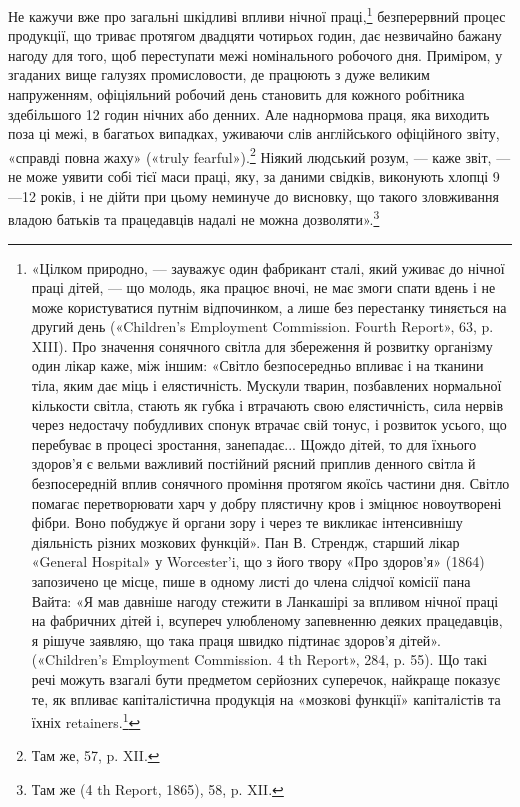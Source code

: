 Не кажучи вже про загальні шкідливі впливи нічної праці,\footnote{
«Цілком природно, — зауважує один фабрикант сталі, який
уживає до нічної праці дітей, — що молодь, яка працює вночі, не має
змоги спати вдень і не може користуватися путнім відпочинком, а лише
без перестанку тиняється на другий день («Children’s Employment Commission.
Fourth Report», 63, p. XIII). Про значення сонячного світла для
збереження й розвитку організму один лікар каже, між іншим: «Світло
безпосередньо впливає і на тканини тіла, яким дає міць і елястичність.
Мускули тварин, позбавлених нормальної кількости світла, стають як губка
і втрачають свою елястичність, сила нервів через недостачу побудливих
спонук втрачає свій тонус, і розвиток усього, що перебуває в процесі
зростання, занепадає... Щождо дітей, то для їхнього здоров’я є вельми
важливий постійний рясний приплив денного світла й безпосередній вплив
сонячного проміння протягом якоїсь частини дня. Світло помагає перетворювати
харч у добру плястичну кров і зміцнює новоутворені фібри. Воно
побуджує й органи зору і через те викликає інтенсивнішу діяльність різних
мозкових функцій». Пан В. Стрендж, старший лікар «General Hospital»
у Worcester’i, що з його твору «Про здоров’я» (1864) запозичено це
місце, пише в одному листі до члена слідчої комісії пана Вайта: «Я мав
давніше нагоду стежити в Ланкашірі за впливом нічної праці на фабричних
дітей і, всупереч улюбленому запевненню деяких працедавців, я
рішуче заявляю, що така праця швидко підтинає здоров’я дітей». («Children’s
Employment Commission. 4 th Report», 284, p. 55). Що такі речі
можуть взагалі бути предметом серйозних суперечок, найкраще показує
те, як впливає капіталістична продукція на «мозкові функції» капіталістів
та їхніх retainers.\footnote*{
— прихильників. Ред.
}
}
безперервний процес продукції, що триває протягом двадцяти чотирьох
годин, дає незвичайно бажану нагоду для того, щоб переступати
межі номінального робочого дня. Приміром, у згаданих
вище галузях промисловости, де працюють з дуже великим напруженням,
офіціяльний робочий день становить для кожного робітника
здебільшого 12 годин нічних або денних. Але наднормова
праця, яка виходить поза ці межі, в багатьох випадках, уживаючи
слів англійського офіційного звіту, «справді повна жаху»
(«truly fearful»).\footnote{
Там же, 57, p. XII.
} Ніякий людський розум, — каже звіт, — не
може уявити собі тієї маси праці, яку, за даними свідків, виконують
хлопці 9—12 років, і не дійти при цьому неминуче
до висновку, що такого зловживання владою батьків та працедавців
надалі не можна дозволяти».\footnote{
Там же (4 th Report, 1865), 58, p. XII.
}

